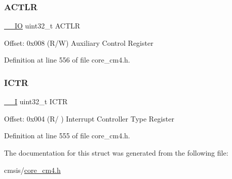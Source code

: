 \subsubsection{\texorpdfstring{A\+C\+T\+LR}{ACTLR}}
{\footnotesize\ttfamily \hyperlink{group___c_m_s_i_s__core__definitions_gaec43007d9998a0a0e01faede4133d6be}{\+\_\+\+\_\+\+IO} uint32\+\_\+t A\+C\+T\+LR}

Offset\+: 0x008 (R/W) Auxiliary Control Register 

Definition at line 556 of file core\+\_\+cm4.\+h.

\mbox{\label{struct_s_cn_s_c_b___type_a5bb2c6795b90f12077534825cc844b56}} 
\subsubsection{\texorpdfstring{I\+C\+TR}{ICTR}}
{\footnotesize\ttfamily \hyperlink{group___c_m_s_i_s__core__definitions_gaf63697ed9952cc71e1225efe205f6cd3}{\+\_\+\+\_\+I} uint32\+\_\+t I\+C\+TR}

Offset\+: 0x004 (R/ ) Interrupt Controller Type Register 

Definition at line 555 of file core\+\_\+cm4.\+h.



The documentation for this struct was generated from the following file\+:\begin{DoxyCompactItemize}
\item 
cmsis/\hyperlink{core__cm4_8h}{core\+\_\+cm4.\+h}\end{DoxyCompactItemize}
